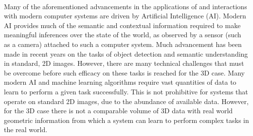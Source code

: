 ~\label{chap:intro}
%

Many of the aforementioned advancements in the applications of and interactions with modern computer 
systems are driven by Artificial Intelligence (AI). Modern AI provides much of the semantic and contextual 
information required to make meaningful inferences over the state of the world, as observed by a sensor 
(such as a camera) attached to such a computer system. Much advancement has been made in recent years on 
the tasks of object detection and semantic understanding in standard, 2D images. However, there are many 
technical challenges that must be overcome before such efficacy on these tasks is reached for the 3D 
case. Many modern AI and machine learning algorithms require vast quantities of data to learn to 
perform a given task successfully. This is not prohibitive for systems that operate on 
standard 2D images, due to the abundance of available data. However, for the 3D case there 
is not a comparable volume of 3D data with real world geometric information from which a system 
can learn to perform complex tasks in the real world.

